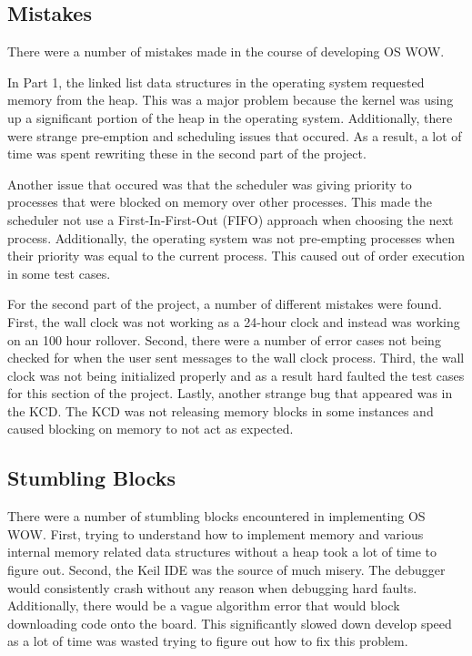 \documentclass[se]{uw-wkrpt}
\begin{document}
\subsection{Mistakes}

There were a number of mistakes made in the course of developing OS WOW.

In Part 1, the linked list data structures in the operating system requested memory from the heap. This was a major problem because the kernel was using up a significant portion of the heap in the operating system. Additionally, there were strange pre-emption and scheduling issues that occured. As a result, a lot of time was spent rewriting these in the second part of the project.

Another issue that occured was that the scheduler was giving priority to processes that were blocked on memory over other processes. This made the scheduler not use a First-In-First-Out (FIFO) approach when choosing the next process. Additionally, the operating system was not pre-empting processes when their priority was equal to the current process. This caused out of order execution in some test cases.

For the second part of the project, a number of different mistakes were found. First, the wall clock was not working as a 24-hour clock and instead was working on an 100 hour rollover. Second, there were a number of error cases not being checked for when the user sent messages to the wall clock process. Third, the wall clock was not being initialized properly and as a result hard faulted the test cases for this section of the project. Lastly, another strange bug that appeared was in the KCD. The KCD was not releasing memory blocks in some instances and caused blocking on memory to not act as expected.

\subsection{Stumbling Blocks}

There were a number of stumbling blocks encountered in implementing OS WOW. First, trying to understand how to implement memory and various internal memory related data structures without a heap took a lot of time to figure out. Second, the Keil IDE was the source of much misery. The debugger would consistently crash without any reason when debugging hard faults. Additionally, there would be a vague algorithm error that would block downloading code onto the board. This significantly slowed down develop speed as a lot of time was wasted trying to figure out how to fix this problem. 
\end{document}
